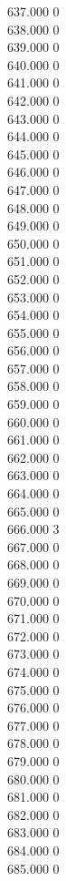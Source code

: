 { 637.000	0 \\
 638.000	0 \\
 639.000	0 \\
 640.000	0 \\
 641.000	0 \\
 642.000	0 \\
 643.000	0 \\
 644.000	0 \\
 645.000	0 \\
 646.000	0 \\
 647.000	0 \\
 648.000	0 \\
 649.000	0 \\
 650.000	0 \\
 651.000	0 \\
 652.000	0 \\
 653.000	0 \\
 654.000	0 \\
 655.000	0 \\
 656.000	0 \\
 657.000	0 \\
 658.000	0 \\
 659.000	0 \\
 660.000	0 \\
 661.000	0 \\
 662.000	0 \\
 663.000	0 \\
 664.000	0 \\
 665.000	0 \\
 666.000	3 \\
 667.000	0 \\
 668.000	0 \\
 669.000	0 \\
 670.000	0 \\
 671.000	0 \\
 672.000	0 \\
 673.000	0 \\
 674.000	0 \\
 675.000	0 \\
 676.000	0 \\
 677.000	0 \\
 678.000	0 \\
 679.000	0 \\
 680.000	0 \\
 681.000	0 \\
 682.000	0 \\
 683.000	0 \\
 684.000	0 \\
 685.000	0 \\
}
